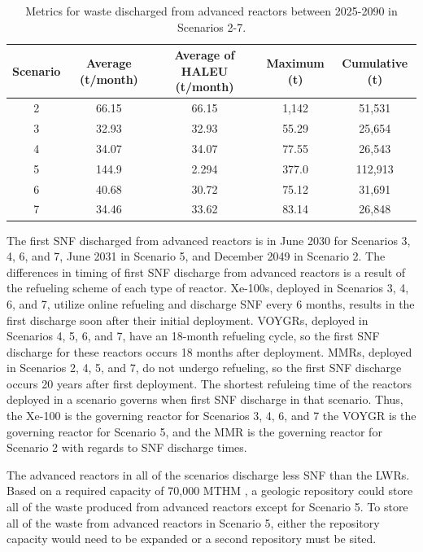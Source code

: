 \begin{table}
    \centering 
    \caption{Metrics for waste discharged from advanced reactors 
    between 2025-2090 in Scenarios 2-7.}
    \label{tab:nogrowth_waste}
    \begin{tabular}{c c c c c}
        \hline
        Scenario & Average (t/month) & Average of \gls{HALEU} 
        (t/month) & Maximum (t) & Cumulative (t)\\\hline
        2 & 66.15 & 66.15 & 1,142 & 51,531\\
        3 & 32.93 & 32.93 & 55.29 & 25,654\\
        4 & 34.07 & 34.07 & 77.55 & 26,543\\
        5 & 144.9 & 2.294 & 377.0 & 112,913\\
        6 & 40.68 & 30.72 & 75.12 & 31,691\\
        7 & 34.46 & 33.62 & 83.14 & 26,848\\
        \hline
    \end{tabular}
\end{table}

The first \gls{SNF} discharged from advanced reactors is in June 
2030 for Scenarios 3, 4, 6, and 7, June 2031 
in Scenario 5, and 
December 2049 in Scenario 2. The differences in timing of first \gls{SNF} 
discharge from advanced reactors is a result of the refueling scheme of 
each type of reactor. Xe-100s, deployed in Scenarios 3, 4, 6, 
and 7, utilize online refueling and discharge \gls{SNF} 
every 6 months, results in the first discharge soon after their initial 
deployment. VOYGRs, deployed in Scenarios 4, 5, 6, and 7, have an 
18-month refueling cycle, so the first \gls{SNF} discharge for these 
reactors occurs 18 months after deployment. \glspl{MMR}, deployed in 
Scenarios 2, 4, 5, and 7, do not undergo refueling, so the first \gls{SNF} 
discharge occurs 20 years after first deployment. The shortest refuleing 
time of the reactors deployed in a scenario governs when 
first \gls{SNF} discharge in that scenario. Thus, the Xe-100 is the 
governing reactor for 
Scenarios 3, 4, 6, and 7 the VOYGR is the governing reactor for Scenario  
5, and the \gls{MMR} is the governing reactor for Scenario 2 with regards 
to \gls{SNF} discharge times. 

The 
advanced reactors in all of the scenarios discharge 
less \gls{SNF} than the \glspl{LWR}. Based on a required capacity of 
70,000 MTHM \cite{noauthor_nuclear_1983}, a geologic repository could store 
all of the waste produced from advanced reactors except for Scenario 5. 
To store all of the waste from advanced reactors in Scenario 5, either 
the repository capacity would need to be expanded or a second repository 
must be sited.

